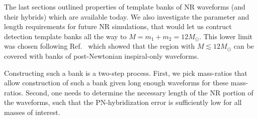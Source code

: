 The last sections outlined properties of template banks of NR
waveforms (and their hybrids) which are available today. 
We also investigate the parameter and length requirements for future NR 
simulations, that would let us contruct detection template banks all the
way to $M=m_1+m_2=12M_\odot$. This lower limit was chosen following 
Ref.~\cite{Brown:2012nn,CompTemplates2009} which showed that the region with
$M\lesssim 12M_\odot$ can be covered with banks of post-Newtonian inspiral-only
waveforms.

Constructing such a bank is a two-step process.  First, we pick mass-ratios 
that allow construction of such a bank given long enough waveforms for these
mass-ratios. Second, one needs to determine the necessary length of the NR 
portion of the waveforms, such that the PN-hybridization error is sufficiently
low for all masses of interest.

